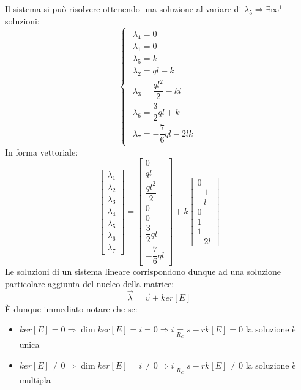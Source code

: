 \documentclass{article}
\begin{document}
\begin{adjustwidth}{2in}{}
Il sistema si può risolvere ottenendo una soluzione al variare di $\lambda_5 \Rightarrow \exists \infty^1$ soluzioni: 
\[  
\begin{cases}
	\begin{aligned}
		\lambda_4 = 0 \\
		\lambda_1 = 0 \\
		\lambda_5 = k \\
		\lambda_2 = ql - k \\
		\lambda_3 = \dfrac{ql^2}{2} - kl \\
		\lambda_6 = \dfrac{3}{2}ql + k \\
		\lambda_7 = -\dfrac{7}{6}ql -2lk		
	\end{aligned}
\end{cases}
\]
In forma vettoriale:
\[  
\left[ \begin{array}{c}
	\lambda_1 \\
	\lambda_2 \\
	\lambda_3 \\
	\lambda_4 \\
	\lambda_5 \\
	\lambda_6 \\
	\lambda_7
\end{array}\right] = \left[ \begin{array}{c}
0 \\
ql \\
\dfrac{ql^2}{2} \\
0 \\
0 \\
\dfrac{3}{2}ql \\
-\dfrac{7}{6}ql
\end{array}\right] + k \left[ \begin{array}{c}
0 \\
-1 \\
-l \\
0 \\
1\\
1\\
-2l
\end{array}\right]
\]
Le soluzioni di un sistema lineare corrispondono dunque ad una soluzione particolare aggiunta del nucleo della matrice:
\[  \vec{\lambda} = \vec{v} + ker[E]\]
È dunque immediato notare che se:
\begin{itemize}
	\item $ker[E] = 0 \Rightarrow \dim ker[E]=i=0 \Rightarrow i \underset{R_C}{=} s - rk[E] = 0$ la soluzione è unica
	\item $ker[E] \ne 0 \Rightarrow \dim ker[E]=i\ne0 \Rightarrow i \underset{R_C}{=} s - rk[E] \ne 0$ la soluzione è multipla 
\end{itemize}


\end{adjustwidth}
\end{document}

